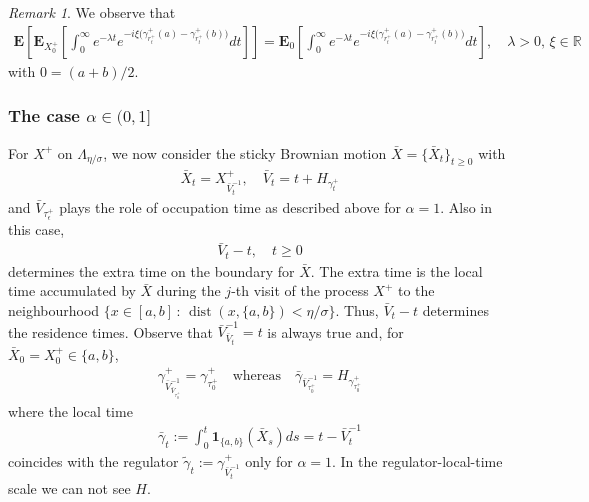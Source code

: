 \documentclass[10pt,a4paper]{article}
\numberwithin{equation}{section}
\theoremstyle{plain}
\theoremstyle{remark}
\newtheorem{remark}{Remark}
\begin{document}
\begin{remark}
We observe that
\begin{align*}
\mathbf{E} \left[ \mathbf{E}_{X^+_0} \left[ \int_0^\infty e^{-\lambda t} e^{-i\xi \big( \gamma^+_{r^+_t}(a) - \gamma^+_{r^+_t}(b) \big)} dt \right] \right] =  \mathbf{E}_{0} \left[ \int_0^\infty e^{-\lambda t} e^{-i\xi \big( \gamma^+_{r^+_t}(a) - \gamma^+_{r^+_t}(b) \big)} dt \right], \quad \lambda>0,\, \xi \in \mathbb{R}
\end{align*}
with $0=(a+b)/2$.
\end{remark}





\subsubsection{The case $\alpha \in (0,1]$}

For $X^+$ on $\Lambda_{\eta/\sigma}$, we now consider the sticky Brownian motion $\bar{X}=\{\bar{X}_t\}_{t \geq 0}$ with
\begin{align*}
\bar{X}_t = X^+_{\bar{V}^{-1}_t}, \quad \bar{V}_t = t + H_{\gamma^+_t}  
\end{align*}
and $\bar{V}_{\tau^+_\epsilon}$ plays the role of occupation time as described above for $\alpha=1$. Also in this case, 
\begin{align*}
\bar{V}_t - t, \quad t \geq 0
\end{align*}
determines the extra time on the boundary for $\bar{X}$. The extra time is the local time accumulated by $\bar{X}$ during the $j$-th visit of the process $X^+$ to the neighbourhood $\{x \in [a,b]\,:\, \operatorname{dist}(x, \{a,b\}) < \eta/\sigma\}$. Thus, $\bar{V}_t - t$ determines the residence times. Observe that $\bar{V}^{-1}_{\bar{V}_t}=t$ is always true and, for $\bar{X}_0= X^+_0  \in \{a,b\}$, 
\begin{align*}
\gamma^+_{\bar{V}^{-1}_{\bar{V}_{\tau^+_0}}} = \gamma^+_{\tau^+_0} \quad \textrm{whereas} \quad \bar{\gamma}_{\bar{V}^{-1}_{\tau^+_0}} = H_{\gamma^+_{\tau^+_0}}
\end{align*}
where the local time
\begin{align*}
\bar{\gamma}_t := \int_0^t \mathbf{1}_{\{a,b\}}(\bar{X}_s) ds = t - \bar{V}^{-1}_t
\end{align*}
coincides with the regulator $\tilde{\gamma}_t := \gamma^+_{\bar{V}^{-1}_t}$ only for $\alpha=1$. In the regulator-local-time scale we can not see $H$.\\
\end{document}
